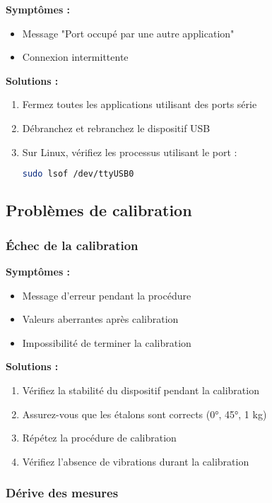 \documentclass[12pt,a4paper]{article}
\begin{document}
\textbf{Symptômes :}
\begin{itemize}
    \item Message "Port occupé par une autre application"
    \item Connexion intermittente
\end{itemize}

\textbf{Solutions :}
\begin{enumerate}
    \item Fermez toutes les applications utilisant des ports série
    \item Débranchez et rebranchez le dispositif USB
    \item Sur Linux, vérifiez les processus utilisant le port :
    \begin{lstlisting}[language=bash]
sudo lsof /dev/ttyUSB0
    \end{lstlisting}
\end{enumerate}

\subsection{Problèmes de calibration}

\subsubsection{Échec de la calibration}

\textbf{Symptômes :}
\begin{itemize}
    \item Message d'erreur pendant la procédure
    \item Valeurs aberrantes après calibration
    \item Impossibilité de terminer la calibration
\end{itemize}

\textbf{Solutions :}
\begin{enumerate}
    \item Vérifiez la stabilité du dispositif pendant la calibration
    \item Assurez-vous que les étalons sont corrects (0°, 45°, 1 kg)
    \item Répétez la procédure de calibration
    \item Vérifiez l'absence de vibrations durant la calibration
\end{enumerate}

\subsubsection{Dérive des mesures}
\end{document}

